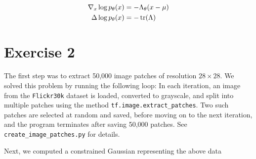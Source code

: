 \documentclass[a4paper]{article}
\theoremstyle{definition}
\theoremstyle{plain}
\begin{document}
\begin{alignat*}{1}
\nabla_x \log p_\theta(x) &= -\Lambda_\theta (x-\mu)\\
\Delta \log p_\theta(x) &= -\trace(\Lambda)
\end{alignat*}







\section*{\center Exercise 2}

The first step was to extract 50,000 image patches of resolution $28\times 28$. We solved this problem by running the following loop: In each iteration, an image from the \texttt{Flickr30k} dataset is loaded, converted to grayscale, and split into multiple patches using the method \texttt{tf.image.extract\_patches}. Two such patches are selected at random and saved, before moving on to the next iteration, and the program terminates after saving 50,000 patches. See \texttt{create\_image\_patches.py} for details.

Next, we computed a constrained Gaussian representing the above data \lipsum[2]
\end{document}
